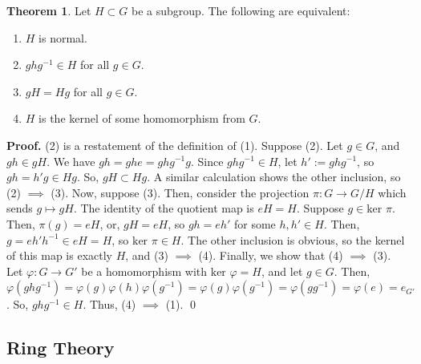 \documentclass{article}
\theoremstyle{definition}
\newtheorem{theorem}{Theorem}[subsection]
\begin{document}
\begin{theorem}
    Let $H\subset G$ be a subgroup. The following are equivalent:
    \begin{enumerate}
        \item $H$ is normal.
        \item $ghg^{-1}\in H$ for all $g\in G$.
        \item $gH=Hg$ for all $g\in G$.
        \item $H$ is the kernel of some homomorphism from $G$.
    \end{enumerate}
\end{theorem}
\textbf{Proof.} (2) is a restatement of the definition of (1). Suppose (2). Let $g\in G$, and $gh\in gH$. We have $gh=ghe=ghg^{-1}g$. Since $ghg^{-1}\in H$, let $h':=ghg^{-1}$, so $gh=h'g\in Hg$. So, $gH\subset Hg$. A similar calculation shows the other inclusion, so (2) $\implies$ (3).
\newline
\newline
Now, suppose (3). Then, consider the projection $\pi: G\rightarrow G/H$ which sends $g\mapsto gH$. The identity of the quotient map is $eH=H$. Suppose $g\in\text{ker } \pi$. Then, $\pi(g)=eH$, or, $gH=eH$, so $gh=eh'$ for some $h,h'\in H$. Then, $g=eh'h^{-1}\in eH=H$, so $\text{ker }\pi\in H$. The other inclusion is obvious, so the kernel of this map is exactly $H$, and (3) $\implies$ (4). 
\newline
\newline
Finally, we show that (4) $\implies$ (3). Let $\varphi:G\rightarrow G'$ be a homomorphism with $\text{ker }\varphi= H$, and let $g\in G$. Then, $\varphi(ghg^{-1})=\varphi(g)\varphi(h)\varphi(g^{-1})=\varphi(g)\varphi(g^{-1})=\varphi(gg^{-1})=\varphi(e)=e_{G'}$. So, $ghg^{-1}\in H$. Thus, (4) $\implies$ (1). \qed 

\subsection{Ring Theory}
\end{document}
